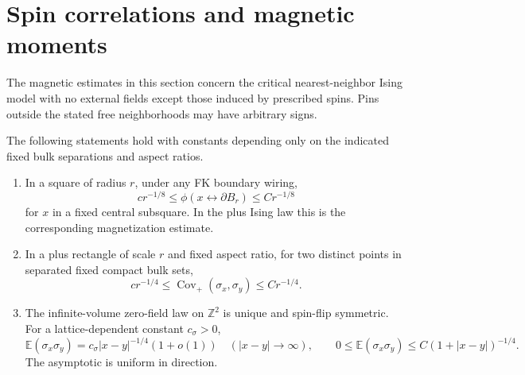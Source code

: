 \section{Spin correlations and magnetic moments}\label{mo:section}

The magnetic estimates in this section concern the critical nearest-neighbor
Ising model with no external fields except those induced by prescribed spins.
Pins outside the stated free neighborhoods may have arbitrary signs.

\begin{lemma}\label{fd:static-correlations}
The following statements hold with constants depending only on the indicated
fixed bulk separations and aspect ratios.
\begin{enumerate}
\item In a square of radius \(r\), under any FK boundary wiring,
\[
 c r^{-1/8}\le
 \phi(x\longleftrightarrow\partial B_r)
 \le C r^{-1/8}
\]
for \(x\) in a fixed central subsquare.  In the plus Ising law this is
the corresponding magnetization estimate.
\item In a plus rectangle of scale \(r\) and fixed aspect ratio, for two
distinct points in separated fixed compact bulk sets,
\[
 c r^{-1/4}\le\operatorname{Cov}_+(\sigma_x,\sigma_y)
 \le C r^{-1/4}.
\]
\item The infinite-volume zero-field law on \(\mathbb Z^2\) is unique and
spin-flip symmetric.  For a lattice-dependent constant \(c_\sigma>0\),
\[
 \mathbb E(\sigma_x\sigma_y)
   =c_\sigma |x-y|^{-1/4}(1+o(1))
       \quad (|x-y|\longrightarrow\infty),
 \qquad
 0\le\mathbb E(\sigma_x\sigma_y)
       \le C(1+|x-y|)^{-1/4}.
\]
The asymptotic is uniform in direction.
\end{enumerate}
\end{lemma}

